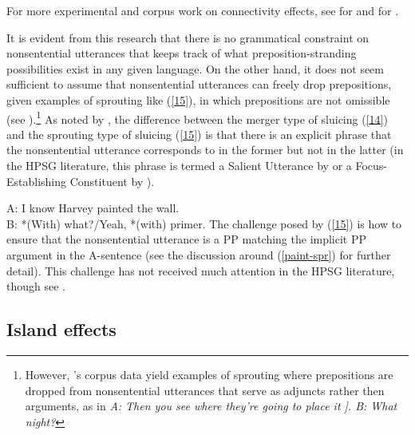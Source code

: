 For more experimental and corpus work on connectivity effects, see \citealt{Sag2011} for  and \citealt{Nykiel2015, Nykiel2017, Nykiel2020} for .

It is evident from this research that there is no grammatical constraint on nonsentential utterances that keeps track of what preposition-stranding possibilities exist in any given language. On the other hand, it does not seem sufficient to assume that nonsentential utterances can freely drop prepositions, given examples of sprouting like (\ref{15}), in which prepositions are not omissible (see \citealt{Chung1995}).\footnote{However, \citet{Hardt2020}'s corpus data yield examples of sprouting where prepositions are dropped from nonsentential utterances that serve as adjuncts rather then arguments, as in \textit{A: Then you see where they’re going to place it ]. B: What night?}}  As noted by \citet[250]{Chung1995},
the difference between the
merger type of sluicing (\ref{14}) and the sprouting type of sluicing (\ref{15}) is that there is an explicit phrase that the nonsentential utterance corresponds to in the former but not in the latter (in the HPSG literature, this phrase is termed a Salient Utterance by \citealt[313]{Ginzburg:Sag:2000} or a Focus-Establishing Constituent by \citealt[234]{Ginzburg2012}). 

\ea A: I know Harvey painted the wall.\\B: *(With) what?/Yeah, *(with) primer.\label{15}\z
%
The challenge posed by (\ref{15}) is how to ensure that
the nonsentential utterance is a PP matching the implicit PP argument in 
the A-sentence (see the discussion
around 
(\ref{paint-spr}) for further detail). This challenge has not received much attention in the HPSG literature, though see \citet{Kim2015}.



\subsection{Island effects}
\label{sec-island-effects}

